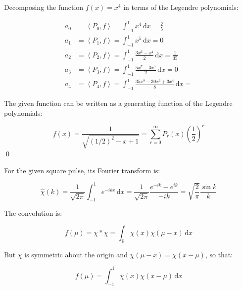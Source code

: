 \documentclass[12pt]{article}
\begin{document}
Decomposing the function $f(x) = x^{4}$ in terms of the Legendre polynomials:

\begin{equation}
\begin{split}
    a_{0} &= \left\langle P_{0}, f \right\rangle = \int_{-1}^{1} x^{4} \, \mathrm{d}x = \frac{2}{5} \\
    a_{1} &= \left\langle P_{1}, f \right\rangle = \int_{-1}^{1} x^{5} \, \mathrm{d}x = 0 \\
    a_{2} &= \left\langle P_{2}, f \right\rangle = \int_{-1}^{1} \frac{3x^{6} - x^{4}}{2} \, \mathrm{d}x = \frac{1}{35} \\
    a_{3} &= \left\langle P_{3}, f \right\rangle = \int_{-1}^{1} \frac{5x^{7} - 3x^{5}}{2} \, \mathrm{d}x = 0 \\
    a_{4} &= \left\langle P_{4}, f \right\rangle = \int_{-1}^{1} \frac{35x^{8} - 30x^{6} + 3x^{4}}{8} \, \mathrm{d}x = {}
\end{split}
\end{equation}

The given function can be written as a generating function of the Legendre polynomials:

\begin{equation}
    f(x) = \frac{1}{\sqrt{(1/2)^2 - x + 1}} = \sum_{r = 0}^{\infty} P_{r}(x) \left( \frac{1}{2} \right)^{r}
\end{equation}
\qed



For the given square pulse, its Fourier transform is:

\begin{equation}
    \hat{\chi}(k) = \frac{1}{\sqrt{2\pi}} \int_{-1}^{1} e^{-ikx} \, \mathrm{d}x = \frac{1}{\sqrt{2\pi}} \frac{e^{-ik} - e^{ik}}{-ik} = \sqrt{\frac{2}{\pi}} \frac{\sin{k}}{k}
\end{equation}

The convolution is:

\begin{equation}
    f(\mu) = \chi \ast \chi = \int_{\mathbb{R}} \chi(x) \chi(\mu - x) \, \mathrm{d}x
\end{equation}

But $\chi$ is symmetric about the origin and $\chi(\mu - x) = \chi(x - \mu)$, so that:

\begin{equation}
    f(\mu) = \int_{-1}^{1} \chi(x) \chi(x - \mu) \, \mathrm{d}x
\end{equation}
\end{document}
